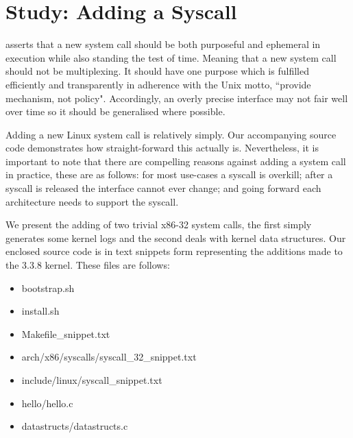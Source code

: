 \documentclass{article}
\begin{document}
\section{Study: Adding a Syscall}

\citet{Love7} asserts that a new system call should be both purposeful and ephemeral in execution while also standing the test of time. 
Meaning that a new system call should not be multiplexing. It should have one purpose which is fulfilled efficiently and transparently 
in adherence with the Unix motto, ``provide mechanism, not policy". Accordingly, 
an overly precise interface may not fair well over time so it should be generalised where possible. 
\par
Adding a new Linux system call is relatively simply. Our accompanying source code demonstrates
how straight-forward this actually is. Nevertheless, it is important to note
that there are compelling reasons against adding 
a system call in practice, these are as follows: for most use-cases a syscall is overkill; 
after a syscall is released the interface cannot ever change;
and going forward each architecture needs to support the syscall.
\par 
We present the adding of two trivial x86-32 system calls, the first simply generates some
kernel logs and the second deals with kernel data structures. Our enclosed 
source code is in text snippets form representing the additions made to
the 3.3.8 kernel. These files are follows:
\begin{itemize}
  \item bootstrap.sh
  \item install.sh
  \item Makefile\_snippet.txt
  \item arch/x86/syscalls/syscall\_32\_snippet.txt
  \item include/linux/syscall\_snippet.txt
  \item hello/hello.c
  \item datastructs/datastructs.c
\end{itemize}
\end{document}
